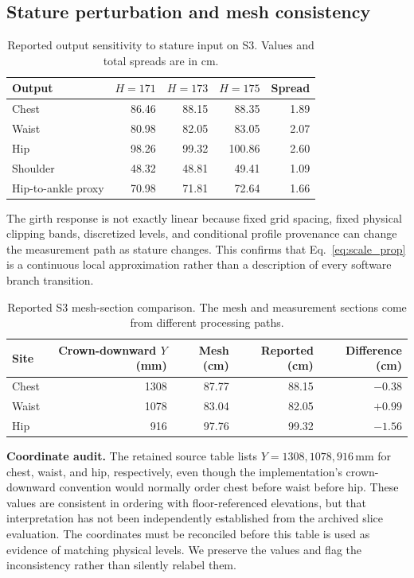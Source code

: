 \subsection{Stature perturbation and mesh consistency}
\begin{table}[htbp]
\centering\small
\caption{Reported output sensitivity to stature input on S3. Values and total spreads are in cm.}
\label{tab:stature_pert}
\begin{tabular}{lrrrr}
\toprule
Output & $H=171$ & $H=173$ & $H=175$ & Spread \\
\midrule
Chest & 86.46 & 88.15 & 88.35 & 1.89 \\
Waist & 80.98 & 82.05 & 83.05 & 2.07 \\
Hip & 98.26 & 99.32 & 100.86 & 2.60 \\
Shoulder & 48.32 & 48.81 & 49.41 & 1.09 \\
Hip-to-ankle proxy & 70.98 & 71.81 & 72.64 & 1.66 \\
\bottomrule
\end{tabular}
\end{table}
The girth response is not exactly linear because fixed grid spacing, fixed physical clipping bands, discretized levels, and conditional profile provenance can change the measurement path as stature changes. This confirms that Eq.~\eqref{eq:scale_prop} is a continuous local approximation rather than a description of every software branch transition.

\begin{table}[htbp]
\centering\small
\caption{Reported S3 mesh-section comparison. The mesh and measurement sections come from different processing paths.}
\label{tab:mesh_slice}
\begin{tabular}{lrrrr}
\toprule
Site & Crown-downward $Y$ (mm) & Mesh (cm) & Reported (cm) & Difference (cm) \\
\midrule
Chest & 1308 & 87.77 & 88.15 & $-0.38$ \\
Waist & 1078 & 83.04 & 82.05 & $+0.99$ \\
Hip & 916 & 97.76 & 99.32 & $-1.56$ \\
\bottomrule
\end{tabular}
\end{table}
\textbf{Coordinate audit.} The retained source table lists $Y=1308,1078,916$\,mm for chest, waist, and hip, respectively, even though the implementation's crown-downward convention would normally order chest before waist before hip. These values are consistent in ordering with floor-referenced elevations, but that interpretation has not been independently established from the archived slice evaluation. The coordinates must be reconciled before this table is used as evidence of matching physical levels. We preserve the values and flag the inconsistency rather than silently relabel them.

